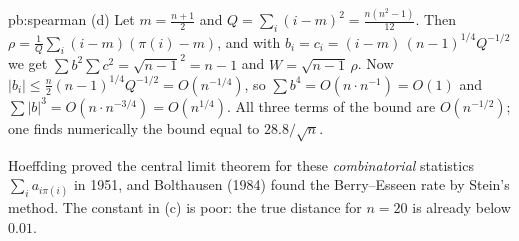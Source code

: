 \begin{solution}{pb:spearman}
(d) Let $m=\frac{n+1}2$ and $Q=\sum_i(i-m)^2=\frac{n(n^2-1)}{12}$. Then $\rho=\frac1Q\sum_i(i-m)(\pi(i)-m)$, and with $b_i=c_i=(i-m)\,(n-1)^{1/4}Q^{-1/2}$ we get $\sum b^2\sum c^2=\sqrt{n-1}^2=n-1$ and
$W=\sqrt{n-1}\,\rho$. Now $|b_i|\le\frac n2(n-1)^{1/4}Q^{-1/2}=O(n^{-1/4})$, so $\sum b^4=O(n\cdot n^{-1})=O(1)$ and $\sum|b|^3=O(n\cdot n^{-3/4})=O(n^{1/4})$. All three
terms of the bound are $O(n^{-1/2})$; one finds numerically the bound equal to $28.8/\sqrt n$.

\leads Hoeffding proved the central limit theorem for these \emph{combinatorial} statistics $\sum_ia_{i\pi(i)}$ in 1951, and Bolthausen (1984) found the Berry--Esseen rate
by Stein's method. The constant in (c) is poor: the true distance for $n=20$ is already below $0.01$.
\end{solution}

